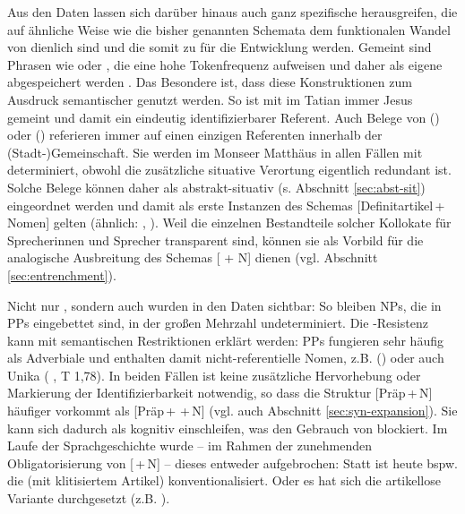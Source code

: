 Aus den Daten lassen sich darüber hinaus auch ganz spezifische  herausgreifen, die auf ähnliche Weise wie die bisher genannten Schemata dem funktionalen Wandel von  dienlich sind und die somit zu  für die Entwicklung werden. Gemeint sind Phrasen wie  oder , die eine hohe Tokenfrequenz aufweisen und daher als eigene  abgespeichert werden  \parencite[= Token-Entrenchment, s.][]{Ziem2013}. Das Besondere ist, dass diese Konstruktionen zum Ausdruck semantischer   genutzt werden. So ist mit   im Tatian immer Jesus gemeint und damit ein eindeutig identifizierbarer Referent. Auch Belege von   () oder   () referieren immer auf einen einzigen Referenten innerhalb der (Stadt-)Gemeinschaft. Sie werden im Monseer Matthäus in allen Fällen mit  determiniert, obwohl die zusätzliche situative  Verortung eigentlich redundant ist. Solche Belege können daher als abstrakt-situativ  (s. Abschnitt \ref{sec:abst-sit}) eingeordnet werden und damit als erste Instanzen des Schemas  [Definitartikel\,+\,Nomen] gelten (ähnlich: , ). Weil die einzelnen Bestandteile solcher Kollokate für Sprecherinnen und Sprecher transparent sind, können sie als Vorbild für die analogische  Ausbreitung des Schemas [ + N] dienen (vgl. Abschnitt \ref{sec:entrenchment}). 

Nicht nur , sondern auch  wurden in den Daten sichtbar: So bleiben  NPs, die in PPs eingebettet sind, in der großen Mehrzahl undeterminiert. Die -Resistenz kann mit semantischen Restriktionen erklärt werden: PPs fungieren sehr häufig als Adverbiale  und enthalten damit nicht-referentielle Nomen, z.B.  () oder auch Unika  ( , T 1,78). In beiden Fällen ist keine zusätzliche Hervorhebung oder Markierung der Identifizierbarkeit notwendig, so dass die Struktur [Präp\,+\,N] häufiger vorkommt als [Präp\,+\,\,+\,N] (vgl. auch Abschnitt \ref{sec:syn-expansion}). Sie kann sich dadurch als  kognitiv einschleifen, was den Gebrauch von  blockiert. Im Laufe der Sprachgeschichte wurde -- im Rahmen der zunehmenden Obligatorisierung von [\,+\,N] -- dieses  entweder aufgebrochen: Statt  ist heute bspw. die   (mit klitisiertem Artikel) konventionalisiert. Oder es hat sich die artikellose Variante durchgesetzt (z.B. ).
